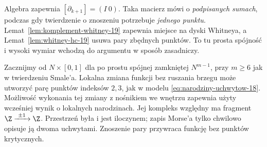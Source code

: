 \begin{uwaga}
Algebra zapewnia
$[\partial_{k+1}]=(I\ 0)$.
Taka macierz mówi o
\emph{podpisanych sumach},
podczas gdy twierdzenie
o znoszeniu potrzebuje
\emph{jednego punktu}.
Lemat~\ref{lem:komplement-whitney-19}
zapewnia miejsce
na dyski Whitneya,
a Lemat~\ref{lem:whitney-hc-19}
usuwa pary zbędnych
punktów. To tu
prosta spójność i
wysoki wymiar
wchodzą do argumentu
w sposób zasadniczy.
\end{uwaga}

\begin{przyklad}
Zacznijmy od
$N\times[0,1]$ dla
po prostu spójnej
zamkniętej $N^{m-1}$, przy $m\geq6$ jak w twierdzeniu Smale'a.
Lokalna zmiana
funkcji bez ruszania
brzegu może utworzyć
parę punktów
indeksów $2,3$,
jak w modelu
\eqref{eq:narodziny-uchwytow-18}.
Możliwość wykonania tej zmiany z nośnikiem we wnętrzu
zapewnia użyty wcześniej wynik o lokalnych narodzinach.
Jej kompleks względny
ma fragment
$\Z\xrightarrow{\ \pm1\ }\Z$.
Przestrzeń była i jest
iloczynem; zapis
Morse'a tylko
chwilowo opisuje ją
dwoma uchwytami.
Znoszenie pary
przywraca funkcję
bez punktów krytycznych.
\end{przyklad}

